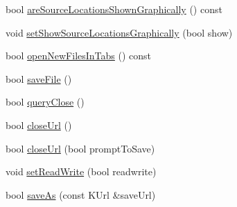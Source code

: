 \begin{DoxyCompactItemize}
\item 
bool \hyperlink{classOkular_1_1Part_ae4f5838d44330407aaa3f7208bdc4ca4}{are\+Source\+Locations\+Shown\+Graphically} () const 
\item 
void \hyperlink{classOkular_1_1Part_ae68bd0c55fee2e2342a780e6c77f2e02}{set\+Show\+Source\+Locations\+Graphically} (bool show)
\item 
bool \hyperlink{classOkular_1_1Part_a8448ef1c92a25f3352f552d0d79cca8d}{open\+New\+Files\+In\+Tabs} () const 
\item 
bool \hyperlink{classOkular_1_1Part_a92ed6a6fe1b4ab3c417bb96403a9eef0}{save\+File} ()
\item 
bool \hyperlink{classOkular_1_1Part_a198e4caf3a79cea6e57be6e4b187152c}{query\+Close} ()
\item 
bool \hyperlink{classOkular_1_1Part_a580d15b57647e05bf4b5d7674efc4dee}{close\+Url} ()
\item 
bool \hyperlink{classOkular_1_1Part_ad4dc22f57f47a936614c58c352603a2a}{close\+Url} (bool prompt\+To\+Save)
\item 
void \hyperlink{classOkular_1_1Part_ae601c6c0ee3208c77233facdab9b0c9f}{set\+Read\+Write} (bool readwrite)
\item 
bool \hyperlink{classOkular_1_1Part_a9041f15a5267877bc062131810811804}{save\+As} (const K\+Url \&save\+Url)
\end{DoxyCompactItemize}
